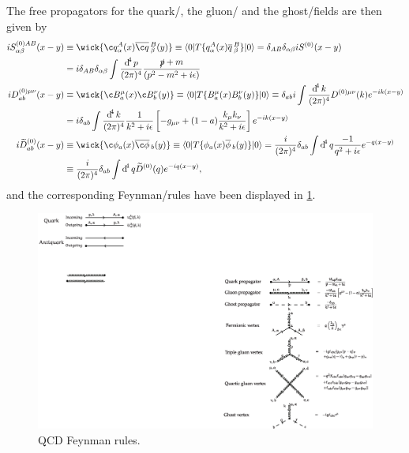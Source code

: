 \documentclass[../../index.tex]{subfiles}
\begin{document}
The free propagators for the quark\-/, the gluon\-/ and the ghost\-/fields are
then given by
\begin{equation}
  \begin{split}
    i S^{(0)AB}_{\alpha\beta}(x-y) &\equiv \wick{ \c q_\alpha^A(x) \anti{\c
        q}_\beta^B(y)} \equiv \langle 0 \vert T \{ q_\alpha^A(x)
    \anti{q}_\beta^B \} \vert 0 \rangle
    = \delta_{AB} \delta_{\alpha\beta} i S^{(0)}(x-y) \\
    &= i \delta_{AB}\delta_{\alpha\beta}\int \fdif{p} \frac{\slashed p + m}{(p^2 - m^2 + i\epsilon)}\\
    i D^{(0)\mu\nu}_{ab}(x-y) &\equiv \wick{ \c B_a^\mu(x) \c B_b^\nu(y)} \equiv
    \langle 0 \vert T \{ B_a^\mu(x) B_b^\nu(y) \} \vert 0 \rangle
    \equiv \delta_{ab}i \int \frac{\dif^4 k}{(2\pi)^4} D^{(0)\mu\nu}(k) e^{-ik(x-y)} \\
    &= i \delta_{ab} \int \frac{\dif^4 k}{(2\pi)^4} \frac{1}{k^2+i\epsilon} \left[ -g_{\mu\nu} + (1-a) \frac{k_\mu k_\nu}{k^2+i\epsilon} \right] e^{-ik(x-y)} \\
    i \widetilde{D}_{ab}^{(0)}(x-y) & \equiv \wick{\c \phi_a(x) \anti{\c
        \phi}_b(y)} \equiv \langle 0 \vert T\{ \phi_a(x) \anti{\phi}_b(y) \}
    \vert 0 \rangle
    = \frac{i}{(2\pi)^4}\delta_{ab} \int \dif^4 q \frac{-1}{q^2 + i\epsilon} e^{-q(x-y)} \\
    &\equiv \frac{i}{(2\pi)^4} \delta_{ab} \int \dif^4 q \widetilde{D}^{(0)}(q)
    e^{-iq(x-y)},
  \end{split}
\end{equation}
and the corresponding Feynman\-/rules have been displayed in
\cref{fig:qcdFeynmanRules}.
\begin{figure}
  \includegraphics[width=\textwidth]{./images/qcdFeynmanRules.eps}
  \caption{QCD Feynman rules.}
  \label{fig:qcdFeynmanRules}
\end{figure}
\end{document}
